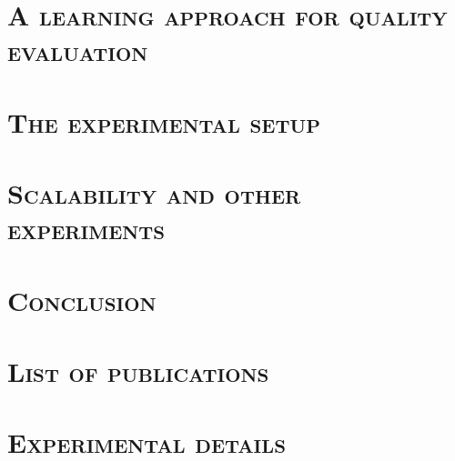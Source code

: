 \documentclass[12pt, twoside]{book}
\begin{document}
    \chapter{\textsc{A learning approach for quality evaluation}}
        \label{chap::learned_evaluation}
        

    \chapter{\textsc{The experimental setup}}
        \label{chap::experiments}
        

    \chapter{\textsc{Scalability and other experiments}}
        \label{chap::more_experiments}
        

    \chapter{\textsc{Conclusion}}
        \label{chap::conclusion}
        
    
    \appendix
    \chapter{\textsc{List of publications}}
        
        \chapter{\textsc{Experimental details}}
        

    \printindex

    \printbibliography[heading=bibintoc]
\end{document}
